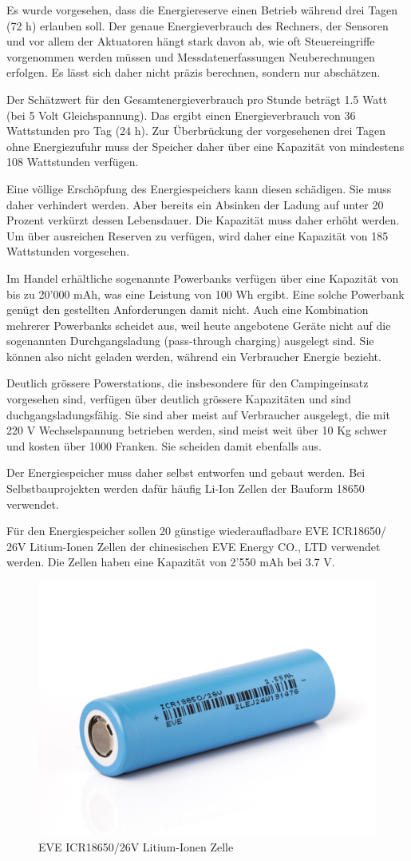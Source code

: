 Es wurde vorgesehen, dass die Energiereserve einen Betrieb während drei Tagen (72 h) erlauben soll. Der genaue Energieverbrauch des Rechners, der Sensoren und vor allem der Aktuatoren hängt stark davon ab, wie oft Steuereingriffe vorgenommen werden müssen und Messdatenerfassungen Neuberechnungen erfolgen. Es lässt sich daher nicht präzis berechnen, sondern nur abschätzen.

Der Schätzwert für den Gesamtenergieverbrauch pro Stunde beträgt 1.5 Watt (bei 5 Volt Gleichspannung). Das ergibt einen Energieverbrauch von 36 Wattstunden pro Tag (24 h). Zur Überbrückung der vorgesehenen drei Tagen ohne Energiezufuhr muss der Speicher daher über eine Kapazität von mindestens 108 Wattstunden verfügen. 

Eine völlige Erschöpfung des Energiespeichers kann diesen schädigen. Sie muss daher verhindert werden. Aber bereits ein Absinken der Ladung auf unter 20 Prozent verkürzt dessen Lebensdauer. Die Kapazität muss daher erhöht werden. Um über ausreichen Reserven zu verfügen, wird daher eine Kapazität von 185 Wattstunden vorgesehen.

Im Handel erhältliche sogenannte Powerbanks verfügen über eine Kapazität von bis zu 20'000 mAh, was eine Leistung von 100 Wh ergibt. Eine solche Powerbank genügt den gestellten Anforderungen damit nicht. Auch eine Kombination mehrerer Powerbanks scheidet aus, weil heute angebotene Geräte nicht auf die sogenannten Durchgangsladung (pass‐through charging) ausgelegt sind. Sie können also nicht geladen werden, während ein Verbraucher Energie bezieht.  

Deutlich grössere Powerstations, die insbesondere für den Campingeinsatz vorgesehen sind, verfügen über deutlich grössere Kapazitäten und sind duchgangsladungsfähig. Sie sind aber meist auf Verbraucher ausgelegt, die mit 220 V Wechselspannung betrieben werden, sind meist weit über 10 Kg schwer und kosten über 1000 Franken. Sie scheiden damit ebenfalls aus. 

Der Energiespeicher muss daher selbst entworfen und gebaut werden. Bei Selbstbauprojekten werden dafür häufig Li-Ion Zellen der Bauform 18650 verwendet.

Für den Energiespeicher sollen 20 günstige wiederaufladbare EVE ICR18650/ 26V Litium-Ionen Zellen der chinesischen EVE Energy CO., LTD verwendet werden. Die Zellen haben eine Kapazität von 2'550 mAh bei 3.7 V.
 \begin{figure}
     \centering
     \includegraphics[width=0.5\linewidth]{assets/EVE-ICR18650-26V-3-6V-3-7V-2600mAh-7-5A-Li-Ionen-Akku.jpg}
     \caption{ EVE ICR18650/26V Litium-Ionen Zelle}
     \label{fig:enter-label}
 \end{figure} 
   
